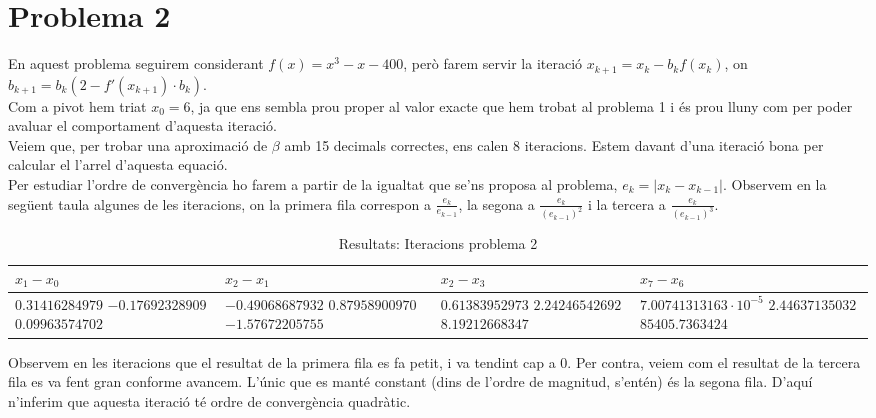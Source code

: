 \documentclass[11pt]{article}
\begin{document}
\section*{Problema 2}
	En aquest problema seguirem considerant $f(x) = x^3 - x - 400$, però farem servir la iteració $x_{k+1} = x_k - b_k f(x_k)$, on $b_{k+1} = b_k \left( 2 - f'(x_{k+1}) \cdot b_k \right)$.\\
	Com a pivot hem triat $x_0 = 6$, ja que ens sembla prou proper al valor exacte que hem trobat al problema 1 i és prou lluny com per poder avaluar el comportament d'aquesta iteració.\\
	Veiem que, per trobar una aproximació de $\beta$ amb 15 decimals correctes, ens calen 8 iteracions. Estem davant d'una iteració bona per calcular el l'arrel d'aquesta equació.\\
	Per estudiar l'ordre de convergència ho farem a partir de la igualtat que se'ns proposa al problema, $e_k = \left| x_k - x_{k-1} \right|$. Observem en la següent taula algunes de les iteracions, on la primera fila correspon a $\frac{e_k}{e_{k-1}}$, la segona a $\frac{e_k}{\left( e_{k-1} \right)^2}$ i la tercera a $\frac{e_k}{\left( e_{k-1} \right)^3}$.
	\begin{table}[H]
		\begin{center}
			\begin{tabular}[c]{|p{30mm}|p{30mm}|p{30mm}|p{35mm}|}
			\hline 
			$x_1 - x_0$& $x_2 - x_1$ & $x_2 - x_3$ & $x_7 - x_6$\\
			\hline 
			$0.31416284979$
			$-0.17692328909$
			$0.09963574702$
			&
			$-0.49068687932$
			$0.87958900970$
			$-1.57672205755$
			&
			$0.61383952973$
			$2.24246542692$
			$8.19212668347$
			&
			$7.00741313163 \cdot 10^{-5}$
			$2.44637135032$
			$85405.7363424$
			\\
			\hline
			\end{tabular}
		\caption{Resultats: Iteracions problema 2}
		\end{center}
	\end{table}
	Observem en les iteracions que el resultat de la primera fila es fa petit, i va tendint cap a $0$. Per contra, veiem com el resultat de la tercera fila es va fent gran conforme avancem. L'únic que es manté constant (dins de l'ordre de magnitud, s'entén) és la segona fila. D'aquí n'inferim que aquesta iteració té ordre de convergència quadràtic.
\newpage
\end{document}

